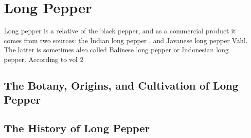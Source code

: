 \section{Long Pepper}
\label{sec:long_pepper}




Long pepper is a relative of the black pepper, and as a commercial product it comes from two sources: the Indian long pepper , and Javanese long pepper  Vahl. The latter is sometimes also called Balinese long pepper or Indonesian long pepper. According to  vol 2


\subsection{The Botany, Origins, and Cultivation of Long Pepper}

\subsection{The History of Long Pepper}

